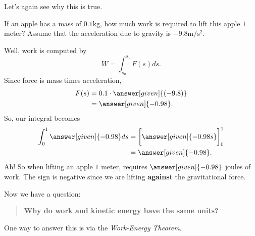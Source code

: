 \documentclass{ximera}
\begin{document}
Let's again see why this is true.
\begin{example}
  If an apple has a mass of $0.1\mathrm{kg}$, how much work is required
  to lift this apple $1$ meter?  Assume that the acceleration due to
  gravity is $-9.8\mathrm{m}/\mathrm{s}^2$.
  \begin{explanation}
    Well, work is computed by
    \[
    W = \int_{s_0}^{s_1} F(s) ds.
    \]
    Since force is mass times acceleration,
    \begin{align*}
      F(s) &= 0.1\cdot \answer[given]{(-9.8)} \\
      &= \answer[given]{-0.98}.
    \end{align*}
    So, our integral becomes
    \begin{align*}
      \int_{0}^{1} \answer[given]{-0.98} ds &= \bigg[ \answer[given]{-0.98 s} \bigg]_0^1\\
      &=\answer[given]{-0.98}.
    \end{align*}
    Ah! So when lifting an apple $1$ meter, requires $\answer[given]{-0.98}$ joules of
    work. The sign is negative since we are lifting \textbf{against}
    the gravitational force.
  \end{explanation}
\end{example}



Now we have a question:
\begin{quote}
 \textbf{Why do work and kinetic energy have the same units?}
\end{quote}

One way to answer this is via the \textit{Work-Energy Theorem}.
\end{document}
